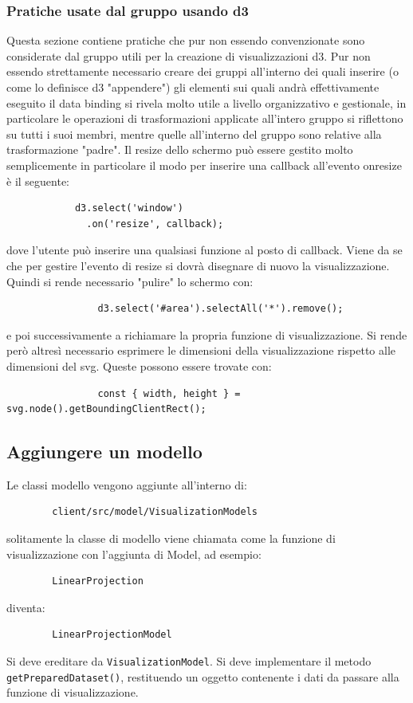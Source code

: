         \subsubsection{Pratiche usate dal gruppo usando d3}
            Questa sezione contiene pratiche che pur non essendo convenzionate sono considerate dal gruppo utili per la creazione di visualizzazioni d3.
            Pur non essendo strettamente necessario creare dei gruppi all'interno dei quali inserire (o come lo definisce d3 "appendere") gli elementi sui quali andrà effettivamente eseguito il data binding si rivela molto utile a livello organizzativo e gestionale, in particolare le operazioni di trasformazioni applicate all'intero gruppo si riflettono su tutti i suoi membri, mentre quelle all'interno del gruppo sono relative alla trasformazione "padre".
            Il resize dello schermo può essere gestito molto semplicemente in particolare il modo per inserire una callback all'evento onresize è il seguente:
            \begin{verbatim}
            d3.select('window')
              .on('resize', callback);
            \end{verbatim}
            dove l'utente può inserire una qualsiasi funzione al posto di callback. Viene da se che per gestire l'evento di resize si dovrà disegnare di nuovo la visualizzazione. Quindi si rende necessario "pulire" lo schermo con:
            \begin{verbatim}
                d3.select('#area').selectAll('*').remove();
            \end{verbatim}
            e poi successivamente a richiamare la propria funzione di visualizzazione.
            Si rende però altresì necessario esprimere le dimensioni della visualizzazione rispetto alle dimensioni del svg. Queste possono essere trovate con:
            \begin{verbatim}
                const { width, height } = svg.node().getBoundingClientRect();
            \end{verbatim}
    \subsection{Aggiungere un modello}
    Le classi modello vengono aggiunte all'interno di:
    \begin{verbatim}
        client/src/model/VisualizationModels
    \end{verbatim}
    solitamente la classe di modello viene chiamata come la funzione di visualizzazione con l'aggiunta di Model, ad esempio:
    \begin{verbatim}
        LinearProjection
    \end{verbatim}
    diventa:
    \begin{verbatim}
        LinearProjectionModel
    \end{verbatim}
    Si deve ereditare da \texttt{VisualizationModel}. Si deve implementare il metodo \texttt{getPreparedDataset()}, restituendo un oggetto contenente i dati da passare alla funzione di visualizzazione.
    
